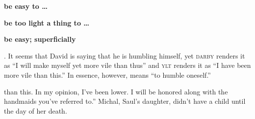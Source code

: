 \begin{inparaenum}
{\begin{inparaenum}
    \item \textbf{be easy to \dots}
    \item \textbf{be too light a thing to \dots}
    \item \textbf{be easy; superficially}
  \end{inparaenum}%
  . It seems that David is saying that he is humbling himself, yet \textsc{darby} renders it as ``I will make myself yet more vile than thus'' and \textsc{ylt} renders it as ``I have been more vile than this.'' In essence, however,  means ``to humble oneself.''} than this. In my opinion, I've been lower. I will be honored along with the handmaids you've referred to.''%
   Michal, Saul's daughter, didn't have a child until the day of her death.%
\end{inparaenum}
